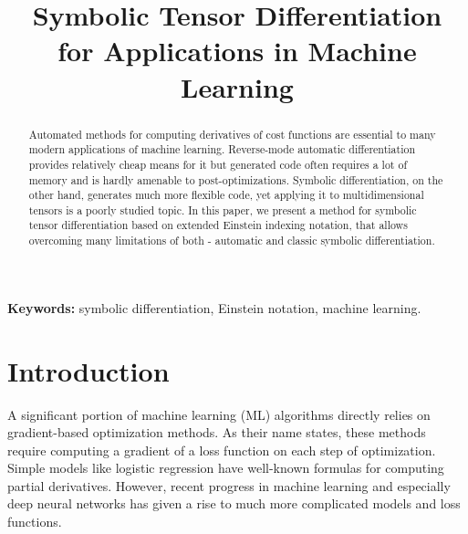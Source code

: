 \documentclass[conference]{IEEEtran}
\begin{document}
\title{Symbolic Tensor Differentiation \\ for Applications in Machine Learning}


\author{   \and {} }

\maketitle


\begin{abstract}
Automated methods for computing derivatives of cost functions are essential to many modern applications of machine learning. Reverse-mode automatic differentiation provides relatively cheap means for it but generated code often requires a lot of memory and is hardly amenable to post-optimizations. Symbolic differentiation, on the other hand, generates much more flexible code, yet applying it to multidimensional tensors is a poorly studied topic. In this paper, we present a method for symbolic tensor differentiation based on extended Einstein indexing notation, that allows overcoming many limitations of both - automatic and classic symbolic differentiation. 


\end{abstract}

\textbf{Keywords:} symbolic differentiation, Einstein notation, machine learning.

\IEEEpeerreviewmaketitle


\section{Introduction}

A significant portion of machine learning (ML) algorithms directly
relies on gradient-based optimization methods. As their name states,
these methods require computing a gradient of a loss function on each
step of optimization. Simple models like logistic regression have
well-known formulas for computing partial derivatives. However, recent
progress in machine learning and especially deep neural networks has
given a rise to much more complicated models and loss functions.
\end{document}

